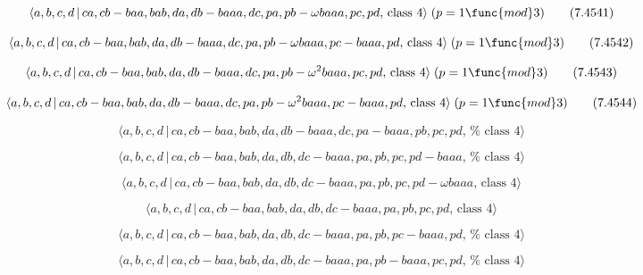 \documentclass[10pt]{article}
\begin{document}
\begin{equation}
\langle a,b,c,d\,|\,ca,cb-baa,bab,da,db-baaa,dc,pa,pb-\omega baaa,pc,pd,\,%
\text{class }4\rangle \;(p=1\func{mod}3)  \tag{7.4541}
\end{equation}

\begin{equation}
\langle a,b,c,d\,|\,ca,cb-baa,bab,da,db-baaa,dc,pa,pb-\omega
baaa,pc-baaa,pd,\,\text{class }4\rangle \;(p=1\func{mod}3)  \tag{7.4542}
\end{equation}

\begin{equation}
\langle a,b,c,d\,|\,ca,cb-baa,bab,da,db-baaa,dc,pa,pb-\omega
^{2}baaa,pc,pd,\,\text{class }4\rangle \;(p=1\func{mod}3)  \tag{7.4543}
\end{equation}

\begin{equation}
\langle a,b,c,d\,|\,ca,cb-baa,bab,da,db-baaa,dc,pa,pb-\omega
^{2}baaa,pc-baaa,pd,\,\text{class }4\rangle \;(p=1\func{mod}3)  \tag{7.4544}
\end{equation}

\begin{equation}
\langle a,b,c,d\,|\,ca,cb-baa,bab,da,db-baaa,dc,pa-baaa,pb,pc,pd,\,\text{%
class }4\rangle  \tag{7.4545}
\end{equation}

\begin{equation}
\langle a,b,c,d\,|\,ca,cb-baa,bab,da,db,dc-baaa,pa,pb,pc,pd-baaa,\,\text{%
class }4\rangle  \tag{7.4546}
\end{equation}

\begin{equation}
\langle a,b,c,d\,|\,ca,cb-baa,bab,da,db,dc-baaa,pa,pb,pc,pd-\omega baaa,\,%
\text{class }4\rangle  \tag{7.4547}
\end{equation}

\begin{equation}
\langle a,b,c,d\,|\,ca,cb-baa,bab,da,db,dc-baaa,pa,pb,pc,pd,\,\text{class }%
4\rangle  \tag{7.4548}
\end{equation}

\begin{equation}
\langle a,b,c,d\,|\,ca,cb-baa,bab,da,db,dc-baaa,pa,pb,pc-baaa,pd,\,\text{%
class }4\rangle  \tag{7.4549}
\end{equation}

\begin{equation}
\langle a,b,c,d\,|\,ca,cb-baa,bab,da,db,dc-baaa,pa,pb-baaa,pc,pd,\,\text{%
class }4\rangle  \tag{7.4550}
\end{equation}
\end{document}
